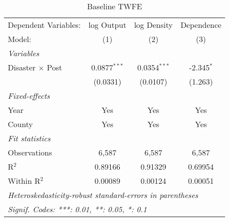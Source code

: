 
\begin{table}[htbp]
   \caption{Baseline TWFE}
   \centering
   \begin{adjustbox}{max width = \textwidth, center}
      \begin{tabular}{lccc}
         \tabularnewline \midrule \midrule
         Dependent Variables:    & log Output     & log Density    & Dependence\\  
         Model:                  & (1)            & (2)            & (3)\\  
         \midrule
         \emph{Variables}\\
         Disaster $\times$ Post  & 0.0877$^{***}$ & 0.0354$^{***}$ & -2.345$^{*}$\\   
                                 & (0.0331)       & (0.0107)       & (1.263)\\   
         \midrule
         \emph{Fixed-effects}\\
         Year                    & Yes            & Yes            & Yes\\  
         County                  & Yes            & Yes            & Yes\\  
         \midrule
         \emph{Fit statistics}\\
         Observations            & 6,587          & 6,587          & 6,587\\  
         R$^2$                   & 0.89166        & 0.91329        & 0.69954\\  
         Within R$^2$            & 0.00089        & 0.00124        & 0.00051\\  
         \midrule \midrule
         \multicolumn{4}{l}{\emph{Heteroskedasticity-robust standard-errors in parentheses}}\\
         \multicolumn{4}{l}{\emph{Signif. Codes: ***: 0.01, **: 0.05, *: 0.1}}\\
      \end{tabular}
   \end{adjustbox}
\end{table}


